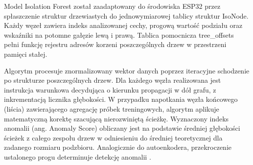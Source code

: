 \documentclass[12pt,twoside]{article}
\begin{document}
Model Isolation Forest został zaadaptowany do środowiska ESP32 przez spłaszczenie struktur drzewiastych do jednowymiarowej tablicy struktur IsoNode. Każdy węzeł zawiera indeks analizowanej cechy, progową wartość podziału oraz wskaźniki na potomne gałęzie lewą i prawą. Tablica pomocnicza tree\_offsets pełni funkcję rejestru adresów korzeni poszczególnych drzew w przestrzeni pamięci stałej.

Algorytm procesuje znormalizowany wektor danych poprzez iteracyjne schodzenie po strukturze poszczególnych drzew. Dla każdego węzła realizowana jest instrukcja warunkowa decydująca o kierunku propagacji w dół grafu, z inkrementacją licznika głębokości. W przypadku napotkania węzła końcowego (liścia) zawierającego agregację próbek treningowych, algorytm aplikuje matematyczną korektę szacującą nierozwiniętą ścieżkę. Wyznaczony indeks anomalii (ang. Anomaly Score) obliczany jest na podstawie średniej głębokości ścieżek z całego zespołu drzew w odniesieniu do średniej teoretycznej dla zadanego rozmiaru podzbioru. Analogicznie do autoenkodera, przekroczenie ustalonego progu determinuje detekcję anomalii  \cite{isoforest}.
\end{document}
